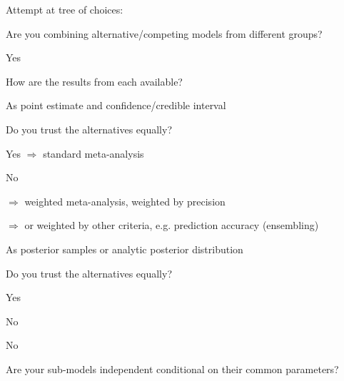 \documentclass{article}
\begin{document}
Attempt at tree of choices:
\begin{tree}
    \item Are you combining alternative/competing models from different groups?
    \begin{tree}
        \item Yes
        \begin{tree}
            \item How are the results from each available?
            \begin{tree}
                \item As point estimate and confidence/credible interval
                \begin{tree}
                    \item Do you trust the alternatives equally?
                    \begin{tree}
                        \item Yes $\Rightarrow$ standard meta-analysis
                        \item No
                        \begin{tree}
                            \item $\Rightarrow$ weighted meta-analysis, weighted by precision
                            \item $\Rightarrow$ or weighted by other criteria, e.g. prediction accuracy (ensembling)
                        \end{tree}
                    \end{tree}
                \end{tree}
                \item As posterior samples or analytic posterior distribution
                \begin{tree}
                    \item Do you trust the alternatives equally?
                    \begin{tree}
                        \item Yes
                        \item No
                    \end{tree}
                \end{tree}
            \end{tree}
        \end{tree}
        \item No
        \begin{tree}
        \item Are your sub-models independent conditional on their common parameters?

\end{tree}
\end{tree}
\end{tree}
\end{document}
